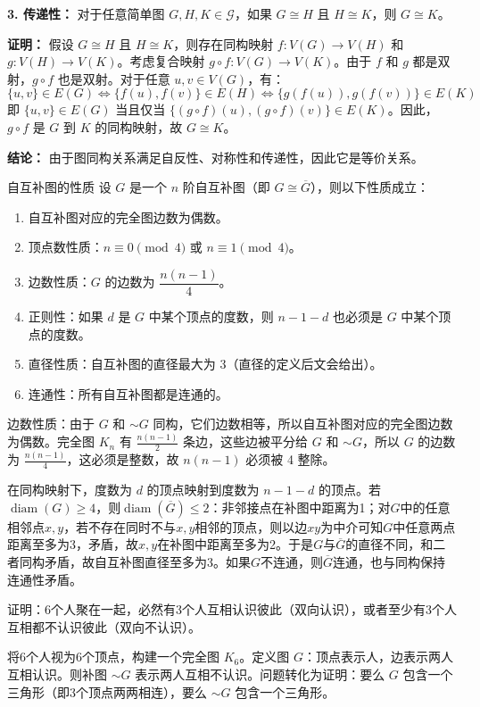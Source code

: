 \documentclass[lang=cn,11pt]{elegantbook}
\begin{document}
\textbf{3. 传递性：} 对于任意简单图 $G, H, K \in \mathcal{G}$，如果 $G \cong H$ 且 $H \cong K$，则 $G \cong K$。

\textbf{证明：}
假设 $G \cong H$ 且 $H \cong K$，则存在同构映射 $f: V(G) \to V(H)$ 和 $g: V(H) \to V(K)$。考虑复合映射 $g \circ f: V(G) \to V(K)$。由于 $f$ 和 $g$ 都是双射，$g \circ f$ 也是双射。对于任意 $u, v \in V(G)$，有：
\[
\{u, v\} \in E(G) \iff \{f(u), f(v)\} \in E(H) \iff \{g(f(u)), g(f(v))\} \in E(K)
\]
即 $\{u, v\} \in E(G)$ 当且仅当 $\{(g \circ f)(u), (g \circ f)(v)\} \in E(K)$。因此，$g \circ f$ 是 $G$ 到 $K$ 的同构映射，故 $G \cong K$。

\textbf{结论：}
由于图同构关系满足自反性、对称性和传递性，因此它是等价关系。
\begin{theorem}{自互补图的性质}
设 $G$ 是一个 $n$ 阶自互补图（即 $G \cong \overline{G}$），则以下性质成立：
\begin{enumerate}[itemsep=2pt, parsep=2pt, topsep=5pt, label=(\arabic*)]
    \item 自互补图对应的完全图边数为偶数。
    \item 顶点数性质：$n \equiv 0 \pmod{4}$ 或 $n \equiv 1 \pmod{4}$。
    \item 边数性质：$G$ 的边数为 $\dfrac{n(n-1)}{4}$。
    \item 正则性：如果 $d$ 是 $G$ 中某个顶点的度数，则 $n-1-d$ 也必须是 $G$ 中某个顶点的度数。
    \item 直径性质：自互补图的直径最大为 3（直径的定义后文会给出）。
    \item 连通性：所有自互补图都是连通的。
\end{enumerate}
\end{theorem}
边数性质：由于 $G$ 和 $\sim G$ 同构，它们边数相等，所以自互补图对应的完全图边数为偶数。完全图 $K_n$ 有 $\frac{n(n-1)}{2}$ 条边，这些边被平分给 $G$ 和 $\sim G$，所以 $G$ 的边数为 $\frac{n(n-1)}{4}$，这必须是整数，故 $n(n-1)$ 必须被 4 整除。

在同构映射下，度数为 $d$ 的顶点映射到度数为 $n-1-d$ 的顶点。若$\operatorname{diam}(G)\ge4$，则$\operatorname{diam}(\overline G)\le2$：非邻接点在补图中距离为1；对$G$中的任意相邻点$x,y$，若不存在同时不与$x,y$相邻的顶点，则以边$xy$为中介可知$G$中任意两点距离至多为3，矛盾，故$x,y$在补图中距离至多为2。于是$G$与$\overline G$的直径不同，和二者同构矛盾，故自互补图直径至多为3。如果$G$不连通，则$\overline G$连通，也与同构保持连通性矛盾。
\begin{example}
    证明：6个人聚在一起，必然有3个人互相认识彼此（双向认识），或者至少有3个人互相都不认识彼此（双向不认识）。
\end{example}
将6个人视为6个顶点，构建一个完全图 $K_6$。定义图 $G$：顶点表示人，边表示两人互相认识。则补图 $\sim G$ 表示两人互相不认识。问题转化为证明：要么 $G$ 包含一个三角形（即3个顶点两两相连），要么 $\sim G$ 包含一个三角形。
\end{document}
